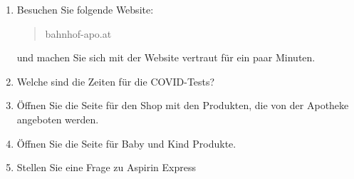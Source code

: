 \documentclass[11pt]{article}
\begin{document}
\pagestyle{empty}


\huge

\begin{enumerate}
\setlength{\itemsep}{3cm plus 2mm minus 2mm}
\setlength{\parskip}{5mm plus 2mm minus 1mm}




\item Besuchen Sie folgende Website:
\begin{quote}
bahnhof-apo.at
\end{quote}
und machen Sie sich mit der Website vertraut f{\"u}r ein paar Minuten.


\filbreak

\item Welche sind die Zeiten f{\"u}r die COVID-Tests?



\filbreak

\item {\"O}ffnen Sie die Seite f{\"u}r den Shop mit den Produkten, die von der Apotheke angeboten werden.


\filbreak

\item {\"O}ffnen Sie die Seite f{\"u}r Baby und Kind Produkte.


\filbreak

\item Stellen Sie eine Frage zu Aspirin Express



\end{enumerate}
\end{document}
